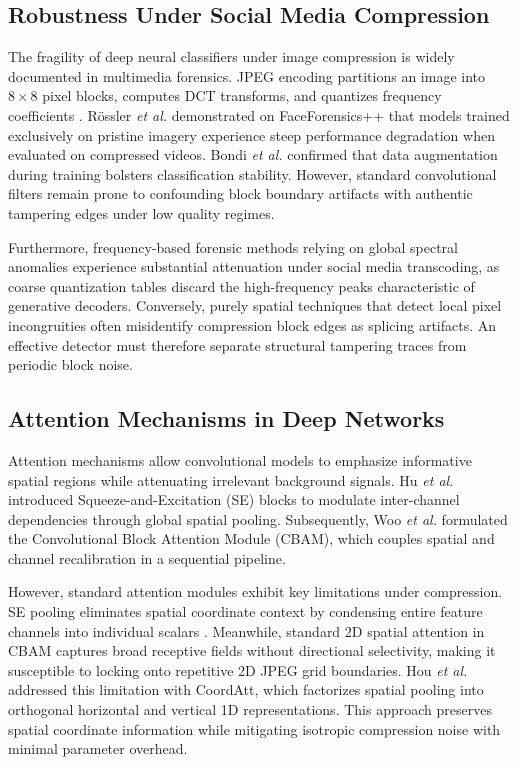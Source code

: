 \documentclass[conference]{IEEEtran}
\begin{document}
\subsection{Robustness Under Social Media Compression}
The fragility of deep neural classifiers under image compression is widely documented in multimedia forensics. JPEG encoding partitions an image into $8 \times 8$ pixel blocks, computes DCT transforms, and quantizes frequency coefficients \cite{verdoliva2020media}. R{\"o}ssler \emph{et al.} \cite{rossler2019faceforensics} demonstrated on FaceForensics++ that models trained exclusively on pristine imagery experience steep performance degradation when evaluated on compressed videos. Bondi \emph{et al.} \cite{bondi2020training} confirmed that data augmentation during training bolsters classification stability. However, standard convolutional filters remain prone to confounding block boundary artifacts with authentic tampering edges under low quality regimes.

Furthermore, frequency-based forensic methods relying on global spectral anomalies \cite{wang2020cnn} experience substantial attenuation under social media transcoding, as coarse quantization tables discard the high-frequency peaks characteristic of generative decoders. Conversely, purely spatial techniques that detect local pixel incongruities \cite{chai2020what} often misidentify compression block edges as splicing artifacts. An effective detector must therefore separate structural tampering traces from periodic block noise.

\subsection{Attention Mechanisms in Deep Networks}
Attention mechanisms allow convolutional models to emphasize informative spatial regions while attenuating irrelevant background signals. Hu \emph{et al.} \cite{hu2018squeeze} introduced Squeeze-and-Excitation (SE) blocks to modulate inter-channel dependencies through global spatial pooling. Subsequently, Woo \emph{et al.} \cite{woo2018cbam} formulated the Convolutional Block Attention Module (CBAM), which couples spatial and channel recalibration in a sequential pipeline.

However, standard attention modules exhibit key limitations under compression. SE pooling eliminates spatial coordinate context by condensing entire feature channels into individual scalars \cite{hou2021coordinate}. Meanwhile, standard 2D spatial attention in CBAM captures broad receptive fields without directional selectivity, making it susceptible to locking onto repetitive 2D JPEG grid boundaries. Hou \emph{et al.} \cite{hou2021coordinate} addressed this limitation with CoordAtt, which factorizes spatial pooling into orthogonal horizontal and vertical 1D representations. This approach preserves spatial coordinate information while mitigating isotropic compression noise with minimal parameter overhead.
\end{document}
